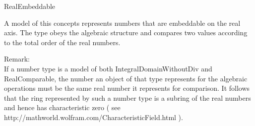 \begin{ccRefConcept}{RealEmbeddable}

\ccDefinition

A model of this concepts represents numbers that are embeddable on the real 
axis. The type obeys the algebraic structure and compares two values according 
to the total order of the real numbers.


Remark:\\
If a number type is a model of both IntegralDomainWithoutDiv and 
RealComparable, the number an object of that type represents for the 
algebraic operations must be the same real number it represents for 
comparison. It follows that the ring represented by such a number type 
is a subring of the real numbers and hence has characteristic zero 
( see http://mathworld.wolfram.com/CharacteristicField.html ).

\ccRefines
{}

\ccOperations
{}
\ccGlue
{}
\ccGlue
{}
\ccGlue
{}
\ccGlue



\ccSeeAlso

\\

\ccHasModels

\end{ccRefConcept}